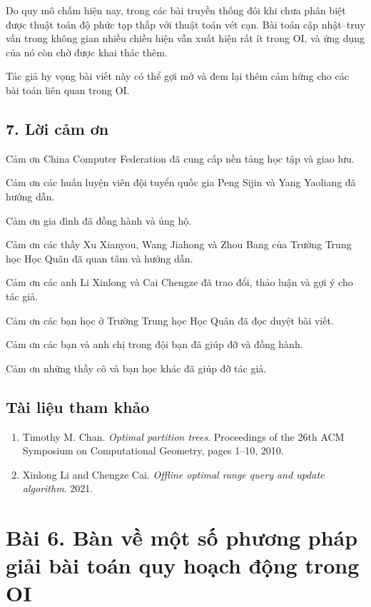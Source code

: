 \documentclass[11pt]{article}
\begin{document}
Do quy mô chấm hiện nay, trong các bài truyền thống đôi khi chưa phân biệt được
thuật toán độ phức tạp thấp với thuật toán vét cạn. Bài toán cập nhật--truy vấn
trong không gian nhiều chiều hiện vẫn xuất hiện rất ít trong OI, và ứng dụng
của nó còn chờ được khai thác thêm.

Tác giả hy vọng bài viết này có thể gợi mở và đem lại thêm cảm hứng cho các
bài toán liên quan trong OI.

\subsection*{7. Lời cảm ơn}

Cảm ơn China Computer Federation đã cung cấp nền tảng học tập và giao lưu.

Cảm ơn các huấn luyện viên đội tuyển quốc gia Peng Sijin và Yang Yaoliang đã
hướng dẫn.

Cảm ơn gia đình đã đồng hành và ủng hộ.

Cảm ơn các thầy Xu Xianyou, Wang Jiahong và Zhou Bang của Trường Trung học Học
Quân đã quan tâm và hướng dẫn.

Cảm ơn các anh Li Xinlong và Cai Chengze đã trao đổi, thảo luận và gợi ý cho
tác giả.

Cảm ơn các bạn học ở Trường Trung học Học Quân đã đọc duyệt bài viết.

Cảm ơn các bạn và anh chị trong đội bạn đã giúp đỡ và đồng hành.

Cảm ơn những thầy cô và bạn học khác đã giúp đỡ tác giả.

\subsection*{Tài liệu tham khảo}

\begin{enumerate}
  \item Timothy M. Chan. \emph{Optimal partition trees}. Proceedings of the
  26th ACM Symposium on Computational Geometry, pages 1--10, 2010.
  \item Xinlong Li and Chengze Cai. \emph{Offline optimal range query and update
  algorithm}. 2021.
\end{enumerate}

\section*{Bài 6. Bàn về một số phương pháp giải bài toán quy hoạch động trong OI}
\end{document}
